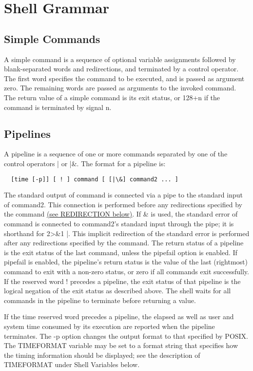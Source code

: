 \section{Shell Grammar}
\label{sec:shellgrammar}
\subsection{Simple Commands}

A simple command is a sequence of optional variable assignments followed by blank-separated words and redirections, and terminated by a control operator. The first word specifies the command to be executed, and is passed as argument zero. The remaining words are passed as arguments to the invoked command.
The return value of a simple command is its exit status, or 128+n if the command is terminated by signal n.

\subsection{Pipelines}

A pipeline is a sequence of one or more commands separated by one of the control operators | or |\&. The format for a pipeline is:
\begin{lstlisting}
  [time [-p]] [ ! ] command [ [|\&] command2 ... ]
\end{lstlisting}
The standard output of command is connected via a pipe to the standard input of command2. This connection is performed before any redirections specified by the command \hyperref[sec:redirection]{(see REDIRECTION below)}. If \& is used, the standard error of command is connected to command2's standard input through the pipe; it is shorthand for 2>\&1 |. This implicit redirection of the standard error is performed after any redirections specified by the command.
The return status of a pipeline is the exit status of the last command, unless the pipefail option is enabled. If pipefail is enabled, the pipeline's return status is the value of the last (rightmost) command to exit with a non-zero status, or zero if all commands exit successfully. If the reserved word ! precedes a pipeline, the exit status of that pipeline is the logical negation of the exit status as described above. The shell waits for all commands in the pipeline to terminate before returning a value.

If the time reserved word precedes a pipeline, the elapsed as well as user and system time consumed by its execution are reported when the pipeline terminates. The -p option changes the output format to that specified by POSIX. The TIMEFORMAT variable may be set to a format string that specifies how the timing information should be displayed; see the description of TIMEFORMAT under Shell Variables below.

